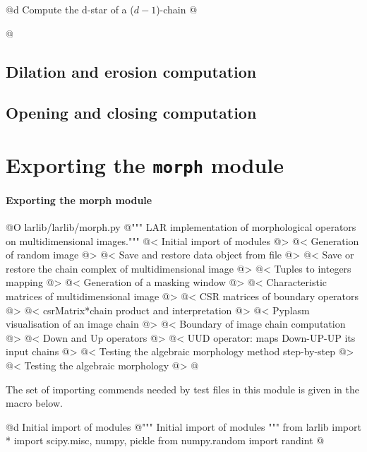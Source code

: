 \documentclass[11pt,oneside]{article}	%
\begin{document}
@d Compute the d-star of a ($d-1$)-chain
@{

@}


\subsection{Dilation and erosion computation}



\subsection{Opening and closing computation}




\section{Exporting the \texttt{morph} module}

\paragraph{Exporting the morph module}
@O larlib/larlib/morph.py
@{""" LAR implementation of morphological operators on multidimensional images."""
@< Initial import of modules @>
@< Generation of random image @>
@< Save and restore data object from file @>
@< Save or restore the chain complex of multidimensional image @>
@< Tuples to integers mapping @>
@< Generation of a masking window @>
@< Characteristic matrices of multidimensional image @>
@< CSR matrices of boundary operators @>
@< csrMatrix*chain product and interpretation @>
@< Pyplasm visualisation of an image chain @>
@< Boundary of image chain computation @>
@< Down and Up operators @>
@< UUD operator: maps Down-UP-UP its input chains @>
@< Testing the algebraic morphology method step-by-step @> 
@< Testing the algebraic morphology @> 
@}

The set of importing commends needed by test files in this module is given in the macro below.

@d Initial import of modules
@{""" Initial import of modules """
from larlib import *
import scipy.misc, numpy, pickle
from numpy.random import randint
@}
\end{document}
